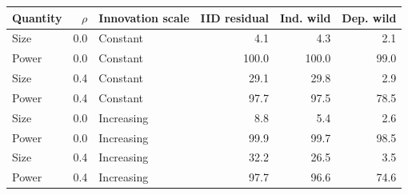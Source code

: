\begin{tabular}{lrlrrr}
\toprule
Quantity & $\rho$ & Innovation scale & IID residual & Ind. wild & Dep. wild \\
\midrule
Size & 0.0 & Constant & 4.1 & 4.3 & 2.1 \\
Power & 0.0 & Constant & 100.0 & 100.0 & 99.0 \\
Size & 0.4 & Constant & 29.1 & 29.8 & 2.9 \\
Power & 0.4 & Constant & 97.7 & 97.5 & 78.5 \\
Size & 0.0 & Increasing & 8.8 & 5.4 & 2.6 \\
Power & 0.0 & Increasing & 99.9 & 99.7 & 98.5 \\
Size & 0.4 & Increasing & 32.2 & 26.5 & 3.5 \\
Power & 0.4 & Increasing & 97.7 & 96.6 & 74.6 \\
\bottomrule
\end{tabular}
